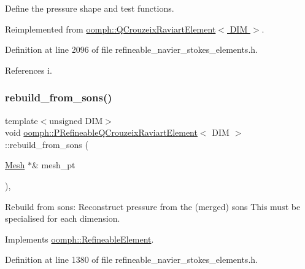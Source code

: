 Define the pressure shape and test functions. 



Reimplemented from \hyperlink{classoomph_1_1QCrouzeixRaviartElement_a662b9593c9ca0b4589d5498812f1fb91}{oomph\+::\+Q\+Crouzeix\+Raviart\+Element$<$ D\+I\+M $>$}.



Definition at line 2096 of file refineable\+\_\+navier\+\_\+stokes\+\_\+elements.\+h.



References i.

\mbox{\label{classoomph_1_1PRefineableQCrouzeixRaviartElement_a0511e9fbba31ef30acd3cf7987d1f4a5}} 
\subsubsection{\texorpdfstring{rebuild\+\_\+from\+\_\+sons()}{rebuild\_from\_sons()}}
{\footnotesize\ttfamily template$<$unsigned D\+IM$>$ \\
void \hyperlink{classoomph_1_1PRefineableQCrouzeixRaviartElement}{oomph\+::\+P\+Refineable\+Q\+Crouzeix\+Raviart\+Element}$<$ D\+IM $>$\+::rebuild\+\_\+from\+\_\+sons (\begin{DoxyParamCaption}\item[{\hyperlink{classoomph_1_1Mesh}{Mesh} $\ast$\&}]{mesh\+\_\+pt }\end{DoxyParamCaption})\hspace{0.3cm}{\ttfamily [inline]}, {\ttfamily [virtual]}}



Rebuild from sons\+: Reconstruct pressure from the (merged) sons This must be specialised for each dimension. 



Implements \hyperlink{classoomph_1_1RefineableElement_a33324be27833fa4b78279d17158215fa}{oomph\+::\+Refineable\+Element}.



Definition at line 1380 of file refineable\+\_\+navier\+\_\+stokes\+\_\+elements.\+h.



